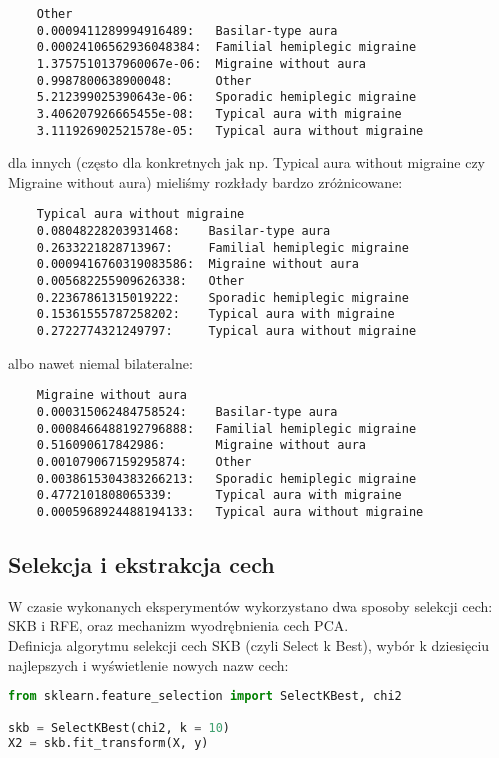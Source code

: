 \begin{verbatim}
    Other
    0.0009411289994916489: 	 Basilar-type aura
    0.00024106562936048384:  Familial hemiplegic migraine
    1.3757510137960067e-06:  Migraine without aura
    0.9987800638900048:      Other
    5.212399025390643e-06: 	 Sporadic hemiplegic migraine
    3.406207926665455e-08: 	 Typical aura with migraine
    3.111926902521578e-05: 	 Typical aura without migraine
\end{verbatim}

dla innych (często dla konkretnych jak np. Typical aura without migraine czy Migraine without aura) mieliśmy rozkłady bardzo zróżnicowane:

\begin{verbatim}
    Typical aura without migraine
    0.08048228203931468:    Basilar-type aura
    0.2633221828713967:     Familial hemiplegic migraine
    0.0009416760319083586:  Migraine without aura
    0.005682255909626338:   Other
    0.22367861315019222:    Sporadic hemiplegic migraine
    0.15361555787258202:    Typical aura with migraine
    0.2722774321249797:     Typical aura without migraine
\end{verbatim}
albo nawet niemal bilateralne:

\begin{verbatim}
    Migraine without aura
    0.000315062484758524:    Basilar-type aura
    0.0008466488192796888:   Familial hemiplegic migraine
    0.516090617842986:       Migraine without aura
    0.001079067159295874:    Other
    0.0038615304383266213:   Sporadic hemiplegic migraine
    0.4772101808065339:      Typical aura with migraine
    0.0005968924488194133:   Typical aura without migraine
\end{verbatim}

\subsection{Selekcja i ekstrakcja cech}
W czasie wykonanych eksperymentów wykorzystano dwa sposoby selekcji cech: SKB i RFE, oraz mechanizm wyodrębnienia cech PCA.\\

Definicja algorytmu selekcji cech SKB (czyli Select k Best), wybór k dziesięciu najlepszych i wyświetlenie nowych nazw cech:
\begin{lstlisting}[language=Python, caption=Definicja selektora SKB]
from sklearn.feature_selection import SelectKBest, chi2

skb = SelectKBest(chi2, k = 10)
X2 = skb.fit_transform(X, y)
\end{lstlisting}

